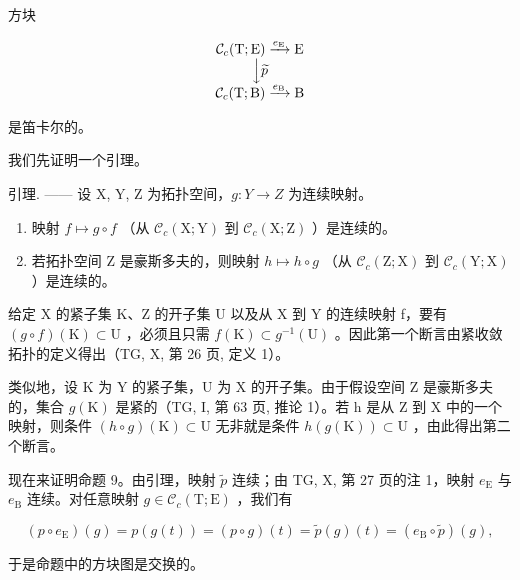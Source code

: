 方块

\[
\begin{array}{c} \mathcal {C} _ {c} (\mathrm{T}; \mathrm{E}) \xrightarrow {e _ {\mathrm{E}}} \mathrm{E} \\ \Big \downarrow \widetilde {p} \\ \mathcal {C} _ {c} (\mathrm{T}; \mathrm{B}) \xrightarrow {e _ {\mathrm{B}}} \mathrm{B} \end{array}
\]

是笛卡尔的。

我们先证明一个引理。

引理. —— 设 X, Y, Z 为拓扑空间，\(g: Y \rightarrow Z\) 为连续映射。

\begin{enumerate}
\def\labelenumi{\alph{enumi})}
\item
  映射 \(f\mapsto g\circ f\) （从 \(\mathcal{C}_c(\mathrm{X};\mathrm{Y})\) 到 \(\mathcal{C}_c(\mathrm{X};\mathrm{Z})\) ）是连续的。
\item
  若拓扑空间 Z 是豪斯多夫的，则映射 \(h \mapsto h \circ g\) （从 \(\mathcal{C}_{c}(\mathrm{Z};\mathrm{X})\) 到 \(\mathcal{C}_{c}(\mathrm{Y};\mathrm{X})\) ）是连续的。
\end{enumerate}

给定 X 的紧子集 K、Z 的开子集 U 以及从 X 到 Y 的连续映射 f，要有 \((g \circ f)(\mathrm{K}) \subset \mathrm{U}\) ，必须且只需 \(f(\mathrm{K}) \subset g^{-1}(\mathrm{U})\) 。因此第一个断言由紧收敛拓扑的定义得出（TG, X, 第 26 页, 定义 1）。

类似地，设 K 为 Y 的紧子集，U 为 X 的开子集。由于假设空间 Z 是豪斯多夫的，集合 \(g(\mathrm{K})\) 是紧的（TG, I, 第 63 页, 推论 1）。若 h 是从 Z 到 X 中的一个映射，则条件 \((h \circ g)(\mathrm{K}) \subset \mathrm{U}\) 无非就是条件 \(h(g(\mathrm{K})) \subset \mathrm{U}\) ，由此得出第二个断言。

现在来证明命题 9。由引理，映射 \(\widetilde{p}\) 连续；由 TG, X, 第 27 页的注 1，映射 \(e_{\mathrm{E}}\) 与 \(e_{\mathrm{B}}\) 连续。对任意映射 \(g \in \mathcal{C}_c(\mathrm{T};\mathrm{E})\) ，我们有

\[
(p \circ e _ {\mathrm{E}}) (g) = p (g (t)) = (p \circ g) (t) = \widetilde {p} (g) (t) = \left(e _ {\mathrm{B}} \circ \widetilde {p}\right) (g),
\]

于是命题中的方块图是交换的。

